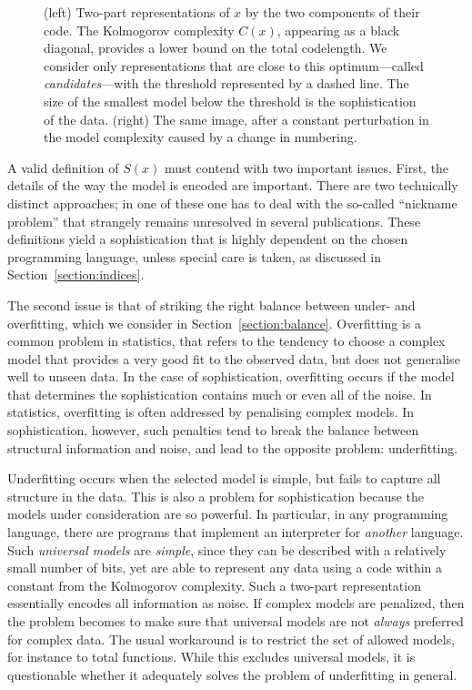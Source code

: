 \documentclass{style/llncs}
\begin{document}
\begin{figure}[tb]
\begin{minipage}{0.40\textwidth}
  \end{minipage}
  \caption{\small (left) Two-part representations of $x$ by the two components of their code. The Kolmogorov complexity $C(x)$, appearing as a black diagonal, provides a lower bound on the total codelength. We consider only representations that are close to this optimum---called \emph{candidates}---with the threshold represented by a dashed line. The size of the smallest model below the threshold is the sophistication of the data. (right) The same image, after a constant perturbation in the model complexity caused by a change in numbering.}
  \label{fig:diagram}
\end{figure}\enlargethispage{3\baselineskip}

A valid definition of $S(x)$ must contend with two important issues. First, the details of the way the model is encoded are important. There are two technically distinct approaches; in one of these one has to deal with the so-called ``nickname problem'' that strangely remains unresolved in several publications. These definitions yield a sophistication that is highly dependent on the chosen programming language, unless special care is taken, as discussed in Section~\ref{section:indices}.

The second issue is that of striking the right balance between under- and overfitting, which we consider in Section~\ref{section:balance}. Overfitting is a common problem in statistics, that refers to the tendency to choose a complex model that provides a very good fit to the observed data, but does not generalise well to unseen data. In the case of sophistication, overfitting occurs if the model that determines the sophistication contains much or even all of the noise. In statistics, overfitting is often addressed by penalising complex models. In sophistication, however, such penalties tend to break the balance between structural information and noise, and lead to the opposite problem: underfitting.

Underfitting occurs when the selected model is simple, but fails to capture all structure in the data. This is also a problem for sophistication because the models under consideration are so powerful. In particular, in any programming language, there are programs that implement an interpreter for \emph{another} language. Such \emph{universal models} are \emph{simple}, since they can be described with a relatively small number of bits, yet are able to represent any data using a code within a constant from the Kolmogorov complexity. Such a two-part representation essentially encodes all information as noise. If complex models are penalized, then the problem becomes to make sure that universal models are not \emph{always} preferred for complex data. The usual workaround is to restrict the set of allowed models, for instance to total functions. While this excludes universal models, it is questionable whether it adequately solves the problem of underfitting in general.
\end{document}
